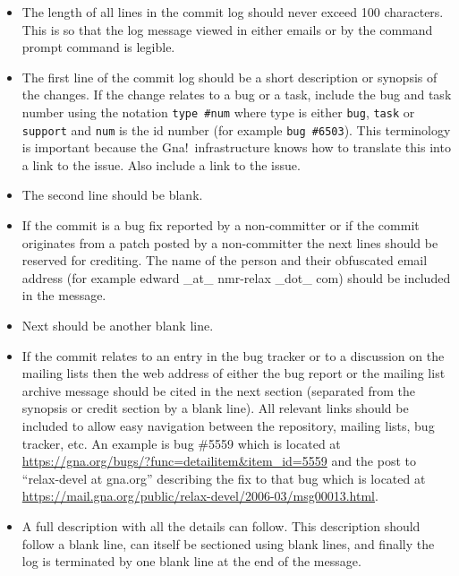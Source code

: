 \begin{itemize}
\item The length of all lines in the commit log should never exceed 100 characters.  This is so that the log message viewed in either emails or by the command prompt command \mbox{} is legible.

\item The first line of the commit log should be a short description or synopsis of the changes.  If the change relates to a bug or a task, include the bug and task number using the notation \texttt{type \#num} where type is either \texttt{bug}, \texttt{task} or \texttt{support} and \texttt{num} is the id number (for example \texttt{bug \#6503}).  This terminology is important because the Gna!\ infrastructure knows how to translate this into a link to the issue.  Also include a link to the issue.

\item The second line should be blank.

\item If the commit is a bug fix reported by a non-committer or if the commit originates from a patch posted by a non-committer the next lines should be reserved for crediting.  The name of the person and their obfuscated email address (for example edward \_at\_ nmr-relax \_dot\_ com) should be included in the message.

\item Next should be another blank line.

\item If the commit relates to an entry in the bug tracker or to a discussion on the mailing lists then the web address of either the bug report or the mailing list archive message should be cited in the next section (separated from the synopsis or credit section by a blank line).  All relevant links should be included to allow easy navigation between the repository, mailing lists, bug tracker, etc.  An example is bug \#5559 which is located at \href{https://gna.org/bugs/?func=detailitem\&item\_id=5559}{https://gna.org/bugs/?func=detailitem\&item\_id=5559} and the post to ``relax-devel at gna.org'' describing the fix to that bug which is located at \href{https://mail.gna.org/public/relax-devel/2006-03/msg00013.html}{https://mail.gna.org/public/relax-devel/2006-03/msg00013.html}.

\item A full description with all the details can follow.  This description should follow a blank line, can itself be sectioned using blank lines, and finally the log is terminated by one blank line at the end of the message.
\end{itemize}

